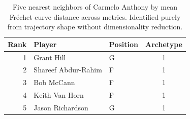 \begin{table}[htbp]
  \centering\small
  \begin{tabular}{rllc}
    \toprule
    Rank & Player & Position & Archetype \\
    \midrule
    1 & Grant Hill & G & 1 \\
    2 & Shareef Abdur-Rahim & F & 1 \\
    3 & Bob McCann & F & 1 \\
    4 & Keith Van Horn & F & 1 \\
    5 & Jason Richardson & G & 1 \\
    \bottomrule
  \end{tabular}
  \caption{Five nearest neighbors of Carmelo Anthony by mean Fr\'{e}chet curve distance across metrics. Identified purely from trajectory shape without dimensionality reduction.}
  \label{tab:Carmelo_Anthony_frechet_curve_neighbors}
\end{table}

